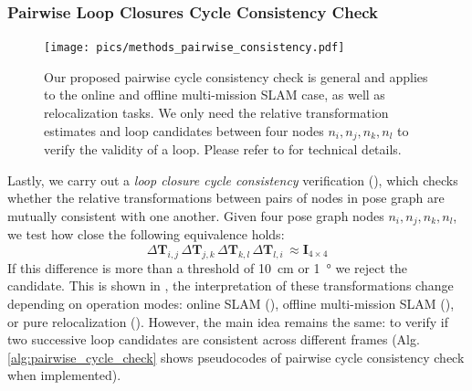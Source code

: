 \subsubsection*{\textbf{Pairwise Loop Closures Cycle Consistency Check}}
\begin{figure}[htbp]
  \centering
  \texttt{[image: pics/methods\_pairwise\_consistency.pdf]}
  \caption{Our proposed pairwise cycle consistency check is general and applies to the online and offline multi-mission SLAM case, as well as relocalization tasks. We only need the relative transformation estimates and loop candidates between four nodes $n_i, n_j, n_k, n_l$ to verify the validity of a loop. Please refer to  for technical details.}
  \label{fig:cycle-consistency}
\end{figure}
Lastly, we carry out a \emph{loop closure cycle consistency} verification (), which checks whether the relative transformations between pairs of nodes in pose graph are mutually consistent with one another. Given four pose graph nodes $n_i, n_j, n_k, n_l$, we test how close the following equivalence holds:
\begin{equation}
\Delta\mathbf{T}_{i,j}\, \Delta\mathbf{T}_{j,k}\, \Delta\mathbf{T}_{k,l}\, \Delta\mathbf{T}_{l,i}\, \approx \mathbf{I}_{4\times4} 
\end{equation}
If this difference is more than a threshold of \SI{10}{\centi\meter} or \SI{1}{\degree} we reject the candidate. This is shown in , the interpretation of these transformations change depending on operation modes: online SLAM (), offline multi-mission SLAM (), or pure relocalization (). However, the main idea remains the same: to verify if two successive loop candidates are consistent across different frames (Alg.\ref{alg:pairwise_cycle_check} shows pseudocodes of pairwise cycle consistency check when implemented).




